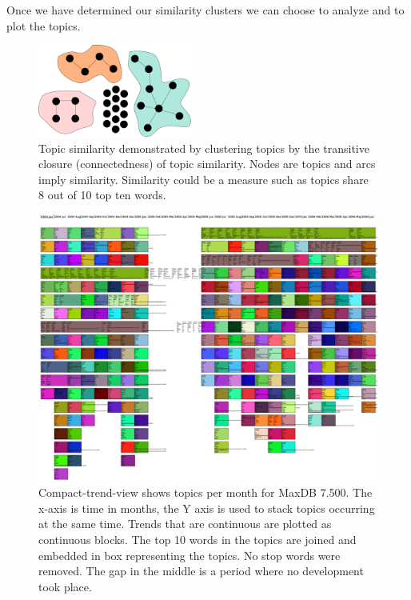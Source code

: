 \documentclass[times, 10pt,twocolumn]{article}
\begin{document}
Once we have determined our similarity clusters we can choose to
analyze and to plot the topics.

\begin{figure}[t]
  \centering
  \includegraphics[width=0.45\textwidth]{transitiveclosure}
  \caption{Topic similarity demonstrated by clustering topics by the transitive closure (connectedness)
    of topic similarity. Nodes are topics and
    arcs imply similarity. Similarity could be a measure such as
    topics share 8 out of 10 top ten words.}
\label{fig:closure}
\end{figure}


\begin{figure}
  \centering
  \includegraphics[width=1.0\textwidth]{time-smear-plot}%
  \caption{Compact-trend-view shows topics per month for MaxDB
    7.500. The x-axis is time in months, the Y axis is used to stack
    topics occurring at the same time. Trends that are continuous are
    plotted as continuous blocks. The top 10 words in the topics are
    joined and embedded in box representing the topics. No stop words were removed. The gap in the
    middle is a period where no development took place.}
  \label{fig:topicsmear}
\end{figure}
\end{document}
